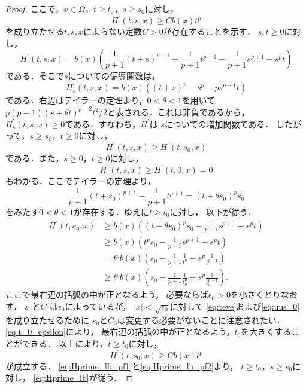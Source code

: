 \begin{proof}
ここで，$x \in \Omega$，$t \geq t_0$，$s \geq s_0$に対し，
\begin{equation}
 H^\prime (t, s, x) \geq C b(x) t^p \label{eq:Hprime_lb}
\end{equation}
を成り立たせる$t, s, x$によらない定数$C>0$が存在することを示す．
$s, t \geq 0$に対し，
\[
 H^\prime(t, s, x) = b(x) \left( \frac{1}{p+1}(t+s)^{p+1} -
 \frac{1}{p+1} t^{p+1} - \frac{1}{p+1} s^{p+1} - s^p t \right)
\]
である．そこで$s$についての偏導関数は，
\[
 H^\prime_s (t, s, x) = b(x) \left( (t+s)^p - s^p - ps^{p-1}t \right)
\]
である．右辺はテイラーの定理より，$0 < \theta < 1$を用いて
$p(p-1)(s + \theta t)^{p-2}t^2/2$と表される．これは非負であるから，
$H^\prime_s(t, s, x) \geq 0$である．すなわち，$H^\prime$は
$s$についての増加関数である．
したがって，$s \geq s_0$，$t \geq 0$に対し，
\begin{equation}
 H^\prime(t, s, x) \geq H^\prime(t, s_0, x) \label{eq:Hprime_lb_pf1}
\end{equation}
である．また，$s \geq 0$，$t \geq 0$に対し，
\begin{equation}
 H^\prime(t, s, x) \geq H^\prime(t, 0, x) = 0 \label{eq:Hprime_lb_pf3}
\end{equation}
もわかる．ここでテイラーの定理より，
\[
 \frac{1}{p+1} (t + s_0)^{p+1} - \frac{1}{p+1} t^{p+1} = (t + \theta
 s_0)^p s_0
\]
 をみたす$0 < \theta < 1$が存在する．ゆえに$t \geq t_0$に対し，
 以下が従う．
 \begin{align*}
  H^\prime(t, s_0, x) &\geq b(x) \left( (t+\theta s_0)^p s_0 -
  \frac{1}{p+1} s^{p+1} - s^p t\right) \\
  & \geq b(x) \left( t^p s_0 - \frac{1}{p+1} s^{p+1} - s^p t \right) \\
  & = t^p b(x) \left( s_0 - \frac{1}{p+1} \frac{1}{t^p} - s^p
  \frac{1}{t^{p-1}}  \right) \\
  & \geq t^p b(x) \left( s_0 - \frac{1}{p+1} \frac{1}{t_0^p} - s^p
  \frac{1}{t_0^{p-1}}  \right).
 \end{align*}
 ここで最右辺の括弧の中が正となるよう，
 必要ならば$\epsilon_0 > 0$を小さくとりなおす．
 $s_0$と$C_0$は$\epsilon_0$によっているが，
 $\lvert x \rvert < \sqrt{\epsilon_0}$に対して
 \eqref{eq:teve}および\eqref{eq:uus_0}を成り立たせるために
 $s_0$と$C_0$は変更する必要がないことに注意されたい．
 \eqref{eq:t_0_epsilon}により，
 最右辺の括弧の中が正となるよう，$t_0$を大きくすることができる．
 以上により，$t \geq t_0$に対し，
 \begin{equation}
  H^\prime (t, s_0, x) \geq C b(x) t^p \label{eq:Hprime_lb_pf2}
 \end{equation}
 が成立する．
 \eqref{eq:Hprime_lb_pf1}と\eqref{eq:Hprime_lb_pf2}より，
 $t \geq t_0$，$s \geq s_0$に対し，
 \eqref{eq:Hprime_lb}が従う．
 

\end{proof}

